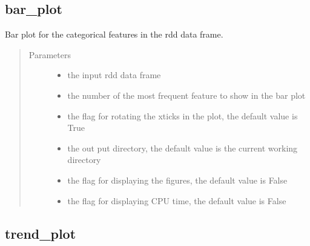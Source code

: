 \documentclass[letterpaper,12pt,english]{sphinxmanual}
\begin{document}
\subsection{bar\_plot}
\label{\detokenize{basics:bar-plot}}

\begin{fulllineitems}
Bar plot for the categorical features in the rdd data frame.
\begin{quote}\begin{description}
\item[{Parameters}] \leavevmode\begin{itemize}
\item {} 
 \textendash{} the input rdd data frame

\item {} 
 \textendash{} the number of the most frequent feature to show in the bar plot

\item {} 
 \textendash{} the flag for rotating the xticks in the plot, the default value is True

\item {} 
 \textendash{} the out put directory, the default value is the current working directory

\item {} 
 \textendash{} the flag for displaying the figures, the default value is False

\item {} 
 \textendash{} the flag for displaying CPU time, the default value is False

\end{itemize}

\end{description}\end{quote}

\end{fulllineitems}



\subsection{trend\_plot}
\label{\detokenize{basics:trend-plot}}
\end{document}
